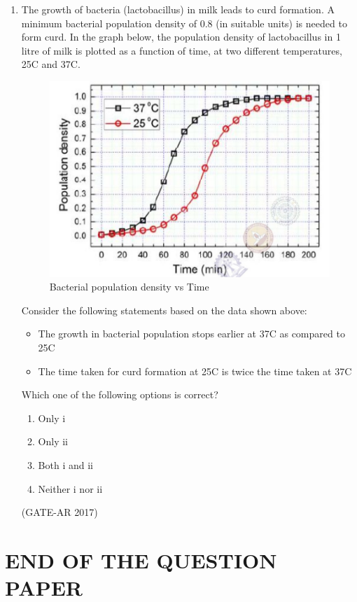 \documentclass[a4paper,10pt]{article}
\begin{document}
\begin{enumerate}
    \item The growth of bacteria (lactobacillus) in milk leads to curd formation. A minimum bacterial population density of 0.8 (in suitable units) is needed to form curd. In the graph below, the population density of lactobacillus in 1 litre of milk is plotted as a function of time, at two different temperatures, 25\textdegree C and 37\textdegree C. \\
    \begin{figure}[h!]
        \centering
        \includegraphics[width=0.5\columnwidth]{figs/05.jpg}
        \caption{Bacterial population density vs Time}
	\label{fig:Img05}
	\end{figure}
    Consider the following statements based on the data shown above: \\
    \begin{itemize}
    \item The growth in bacterial population stops earlier at 37\textdegree C as compared to 25\textdegree C
    \item The time taken for curd formation at 25\textdegree C is twice the time taken at 37\textdegree C
    \end{itemize}
    Which one of the following options is correct?
    \begin{multicols}{2}
	\begin{enumerate}
        \item Only i
        \item Only ii
        \item Both i and ii
        \item Neither i nor ii
    \end{enumerate}
	\end{multicols}
    \hfill (GATE-AR 2017)
    
\end{enumerate}

\centering
\section*{END OF THE QUESTION PAPER}
\end{document}
